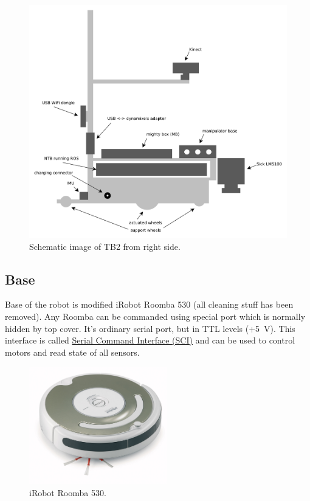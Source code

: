 \documentclass[12pt,a4paper,titlepage]{article}
\numberwithin{equation}{subsection}
\begin{document}
\begin{center}
 \begin{figure}
	\centering\includegraphics[width=16cm]{./img/tb2.pdf}
 \caption{Schematic image of TB2 from right side.}
 \label{fig:tb2}
 \end{figure}
\end{center}

\subsection{Base}

Base of the robot is modified iRobot Roomba 530 (all cleaning stuff has been removed).
Any Roomba can be commanded using special port which is normally hidden by top cover. It's ordinary serial port, but in TTL levels (+5~V). This interface is called \href{http://www.irobot.com/images/consumer/hacker/roomba_sci_spec_manual.pdf}{Serial Command Interface (SCI)} and can be used to control motors and read state of all sensors.

\begin{center}
 \begin{figure}[!h]
	\centering\includegraphics[width=6cm]{./img/roomba-530.jpg}
 \caption{iRobot Roomba 530.}
 \label{fig:roomba}
 \end{figure}
\end{center}
\end{document}
